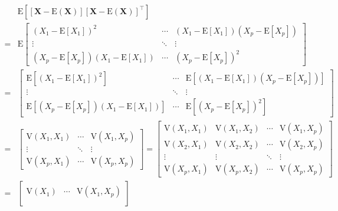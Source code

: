 \documentclass[
]{book}
\theoremstyle{definition}
\theoremstyle{definition}
\theoremstyle{definition}
\theoremstyle{definition}
\theoremstyle{remark}
\begin{document}
\begin{align}
\label{eq:covmatrix}
 & \mathrm{E}\left[\left[\boldsymbol{X}-\mathrm{E}\left(\boldsymbol{X}\right)\right]\left[\boldsymbol{X}-\mathrm{E}\left(\boldsymbol{X}\right)\right]^{\intercal}\right]\\
= & \mathrm{E}\begin{bmatrix}\left(X_{1}-\mathrm{E}\left[X_{1}\right]\right)^{2} & \cdots & \left(X_{1}-\mathrm{E}\left[X_{1}\right]\right)\left(X_{p}-\mathrm{E}\left[X_{p}\right]\right)\\
\vdots & \ddots & \vdots\\
\left(X_{p}-\mathrm{E}\left[X_{p}\right]\right)\left(X_{1}-\mathrm{E}\left[X_{1}\right]\right) & \cdots & \left(X_{p}-\mathrm{E}\left[X_{p}\right]\right)^{2}
\end{bmatrix}\\
= & \begin{bmatrix}\mathrm{E}\left[\left(X_{1}-\mathrm{E}\left[X_{1}\right]\right)^{2}\right] & \cdots & \mathrm{E}\left[\left(X_{1}-\mathrm{E}\left[X_{1}\right]\right)\left(X_{p}-\mathrm{E}\left[X_{p}\right]\right)\right]\\
\vdots & \ddots & \vdots\\
\mathrm{E}\left[\left(X_{p}-\mathrm{E}\left[X_{p}\right]\right)\left(X_{1}-\mathrm{E}\left[X_{1}\right]\right)\right] & \cdots & \mathrm{E}\left[\left(X_{p}-\mathrm{E}\left[X_{p}\right]\right)^{2}\right]
\end{bmatrix}\\
= & \begin{bmatrix}\mathrm{V}\left(X_{1},X_{1}\right) & \cdots & \mathrm{V}\left(X_{1},X_{p}\right)\\
\vdots & \ddots & \vdots\\
\mathrm{V}\left(X_{p},X_{1}\right) & \cdots & \mathrm{V}\left(X_{p},X_{p}\right)
\end{bmatrix}=\begin{bmatrix}\mathrm{V}\left(X_{1},X_{1}\right) & \mathrm{V}\left(X_{1},X_{2}\right) & \cdots & \mathrm{V}\left(X_{1},X_{p}\right)\\
\mathrm{V}\left(X_{2},X_{1}\right) & \mathrm{V}\left(X_{2},X_{2}\right) & \cdots & \mathrm{V}\left(X_{2},X_{p}\right)\\
\vdots & \vdots & \ddots & \vdots\\
\mathrm{V}\left(X_{p},X_{1}\right) & \mathrm{V}\left(X_{p},X_{2}\right) & \cdots & \mathrm{V}\left(X_{p},X_{p}\right)
\end{bmatrix}\\
= & \begin{bmatrix}\mathrm{V}\left(X_{1}\right) & \cdots & \mathrm{V}\left(X_{1},X_{p}\right)\\

\end{bmatrix}
\end{align}
\end{document}
